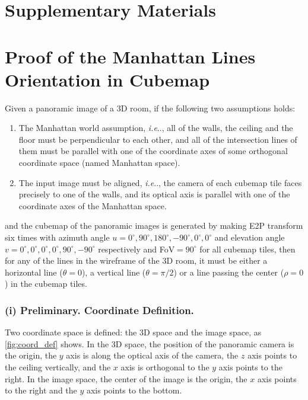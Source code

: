 \documentclass[runningheads]{llncs}
\makeatletter
\DeclareRobustCommand\onedot{\futurelet\@let@token\@onedot}
\def\@onedot{\ifx\@let@token.\else.\null\fi\xspace}
\def\ie{\emph{i.e}\onedot} \def\Ie{\emph{I.e}\onedot}
\makeatother
\begin{document}
\renewcommand\thesection{\Alph{section}}
\renewcommand\thesubsection{\thesection.\arabic{subsection}}
\newpage
\section*{\centering \Large Supplementary Materials}
\setcounter{section}{0}
\section{Proof of the Manhattan Lines Orientation in Cubemap}
\label{sec:proof}

Given a panoramic image of a 3D room, if the following two assumptions holds:
\normalem
\begin{enumerate}
    \item The Manhattan world assumption, \ie, all of the walls, the ceiling and the floor must be perpendicular to each other, and all of the intersection lines of them must be parallel with one of the coordinate axes of some orthogonal coordinate space (named Manhattan space).
\item The input image must be aligned, \ie, the camera of each cubemap tile faces precisely to one of the walls, and its optical axis is parallel with one of the coordinate axes of the Manhattan space.
\end{enumerate}
\ULforem
and the cubemap of the panoramic images is generated by making E2P transform six times with azimuth angle $u=0^{\circ},90^{\circ},180^{\circ},-90^{\circ},0^{\circ},0^{\circ}$ and elevation angle $v=0^{\circ},0^{\circ},0^{\circ},0^{\circ},90^{\circ},-90^{\circ}$ respectively and FoV$=90^{\circ}$ for all cubemap tiles,
then for any of the lines in the wireframe of the 3D room, it must be either a horizontal line ($\theta=0$), a vertical line ($\theta=\pi/2$) or a line passing the center ($\rho=0$) in the cubemap tiles.

\subsubsection{\textbf{(i) Preliminary. Coordinate Definition.}} 
Two coordinate space is defined: the 3D space and the image space, as \cref{fig:coord_def} shows. In the 3D space, the position of the panoramic camera is the origin, the $y$ axis is along the optical axis of the camera, the $z$ axis points to the ceiling vertically, and the $x$ axis is orthogonal to the $y$ axis points to the right. In the image space, the center of the image is the origin, the $x$ axis points to the right and the $y$ axis points to the bottom.
\end{document}
